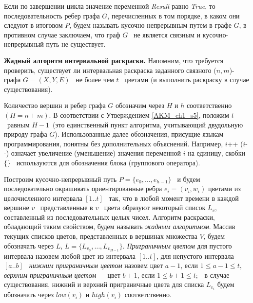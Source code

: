 Если по завершении цикла значение переменной \foreignlanguage{english}{\textit{Result}} равно
\foreignlanguage{english}{\textit{True}}, то последовательность ребер графа  $G$, перечисленных в том порядке, в каком
они следуют в итоговом  $P$, будем называть кусочно-непрерывным путем в графе  $G$, в противном случае заключаем, что
граф  $G$ \ не является связным и кусочно-непрерывный путь не существует.

\textbf{Жадный алгоритм }\textbf{интервальной раскраски. }Напомним, что требуется проверить, существует ли интервальная
раскраска заданного связного ($n,m$)-графа  $G=(X,Y,E)$ \ не более чем  $t$ \ цветами (и выполнить раскраску в случае
существования).

Количество вершин и ребер графа  $G$ обозначим через  $H$ и $h$ соответственно $(H=n+m)$. В соответствии с
Утверждением \ref{AKM_ch1_s5}, положим  $t$ \ равным  $H-1$\ (это единственный пункт алгоритма, учитывающий двудольную природу графа
$G$). Использованные далее обозначения, присущие языкам программирования, понятны без дополнительных объяснений.
Например,  $i$++ ($i${}-{}-) означает увеличение (уменьшение) значения переменной  $i$ на единицу, скобки  $\{\}$
\ используются для обозначения блока (группового оператора).

Построим кусочно-непрерывный путь  $P=\{e_0,\dots ,e_{h-1}\}$ \ и будем последовательно окрашивать ориентированные
ребра  $e_i=(v_i,w_i)$ цветами из целочисленного интервала  $[1..t]$ \ так, что в любой момент времени в каждой
вершине  $v$ \ представленные в  $v$ \ цвета образуют некоторый список  $L_v$, составленный из последовательных целых
чисел. Алгоритм раскраски, обладающий таким свойством, будем называть \textit{жадным алгоритмом}. Массив текущих
списков цветов, представленных в вершинах множества  $V$, будем обозначать через  $L$,
$L=\{L_{v_0},\dots ,L_{v_{H-1}}\}$. \textit{Приграничным цветом} для пустого интервала назовем любой цвет из интервала
$[1..t]$, для непустого интервала  $[a..b]$ \textit{\ нижним приграничным цветом} назовем цвет  $a-1$, если
$1\leq a-1\leq t$, \textit{верхним приграничным цветом} --- цвет  $b+1$, если  $1\leq b+1\leq t;$ \ в случае
существования, нижний и верхний приграничные цвета для списка  $L_{v_i}$  будем обозначать через
$\mathit{low}\left(v_i\right)$  и  $\mathit{high}(v_i)$ соответственно.

